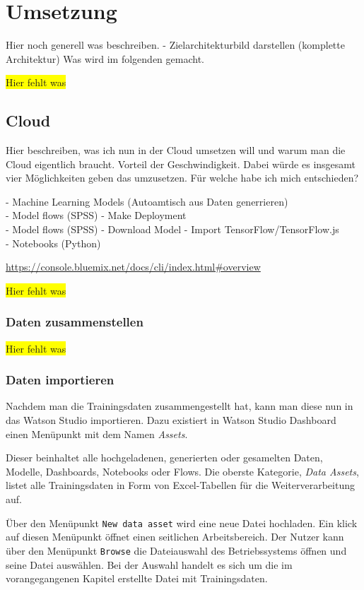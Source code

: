 \section{Umsetzung}
Hier noch generell was beschreiben. - Zielarchitekturbild darstellen (komplette Architektur)
Was wird im folgenden gemacht.

\colorbox{yellow}{Hier fehlt was}

\subsection{Cloud}
Hier beschreiben, was ich nun in der Cloud umsetzen will und warum man die Cloud eigentlich braucht. Vorteil der
Geschwindigkeit. Dabei würde es insgesamt vier Möglichkeiten geben das umzusetzen. Für welche habe ich mich
entschieden?

- Machine Learning Models (Autoamtisch aus Daten generrieren)\\
- Model flows (SPSS) - Make Deployment\\
- Model flows (SPSS) - Download Model - Import TensorFlow/TensorFlow.js\\
- Notebooks (Python)

\url{https://console.bluemix.net/docs/cli/index.html#overview}

\colorbox{yellow}{Hier fehlt was}

\subsubsection{Daten zusammenstellen}
\colorbox{yellow}{Hier fehlt was}

\subsubsection{Daten importieren}
Nachdem man die Trainingsdaten zusammengestellt hat, kann man diese nun in das Watson Studio importieren. Dazu existiert
in Watson Studio Dashboard einen Menüpunkt mit dem Namen \textit{Assets}.

Dieser beinhaltet alle hochgeladenen, generierten oder gesamelten Daten, Modelle, Dashboards, Notebooks oder Flows. Die
oberste Kategorie, \textit{Data Assets}, listet alle Trainingsdaten in Form von Excel-Tabellen für die Weiterverarbeitung
auf.

Über den Menüpunkt \texttt{New data asset} wird eine neue Datei hochladen. Ein klick auf diesen Menüpunkt öffnet einen
seitlichen Arbeitsbereich. Der Nutzer kann über den Menüpunkt \texttt{Browse} die Dateiauswahl des Betriebssystems
öffnen und seine Datei auswählen. Bei der Auswahl handelt es sich um die im vorangegangenen Kapitel erstellte Datei mit
Trainingsdaten.

